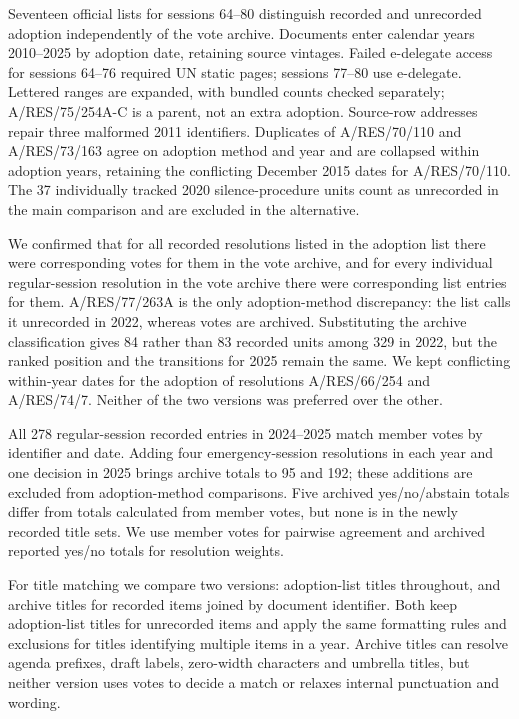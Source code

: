 \documentclass[10pt,authoryear]{elsarticle}
\begin{document}
Seventeen official lists for sessions 64--80 distinguish recorded and unrecorded adoption independently of the vote archive. Documents enter calendar years 2010--2025 by adoption date, retaining source vintages. Failed e-delegate access for sessions 64--76 required UN static pages; sessions 77--80 use e-delegate. Lettered ranges are expanded, with bundled counts checked separately; A/RES/75/254A-C is a parent, not an extra adoption. Source-row addresses repair three malformed 2011 identifiers. Duplicates of A/RES/70/110 and A/RES/73/163 agree on adoption method and year and are collapsed within adoption years, retaining the conflicting December 2015 dates for A/RES/70/110. The 37 individually tracked 2020 silence-procedure units count as unrecorded in the main comparison and are excluded in the alternative.

We confirmed that for all recorded resolutions listed in the adoption list there were corresponding votes for them in the vote archive, and for every individual regular-session resolution in the vote archive there were corresponding list entries for them. A/RES/77/263A is the only adoption-method discrepancy: the list calls it unrecorded in 2022, whereas votes are archived. Substituting the archive classification gives 84 rather than 83 recorded units among 329 in 2022, but the ranked position and the transitions for 2025 remain the same. We kept conflicting within-year dates for the adoption of resolutions A/RES/66/254 and A/RES/74/7. Neither of the two versions was preferred over the other.

All 278 regular-session recorded entries in 2024--2025 match member votes by identifier and date. Adding four emergency-session resolutions in each year and one decision in 2025 brings archive totals to 95 and 192; these additions are excluded from adoption-method comparisons. Five archived yes/no/abstain totals differ from totals calculated from member votes, but none is in the newly recorded title sets. We use member votes for pairwise agreement and archived reported yes/no totals for resolution weights.

For title matching we compare two versions: adoption-list titles throughout, and archive titles for recorded items joined by document identifier. Both keep adoption-list titles for unrecorded items and apply the same formatting rules and exclusions for titles identifying multiple items in a year. Archive titles can resolve agenda prefixes, draft labels, zero-width characters and umbrella titles, but neither version uses votes to decide a match or relaxes internal punctuation and wording.
\end{document}

